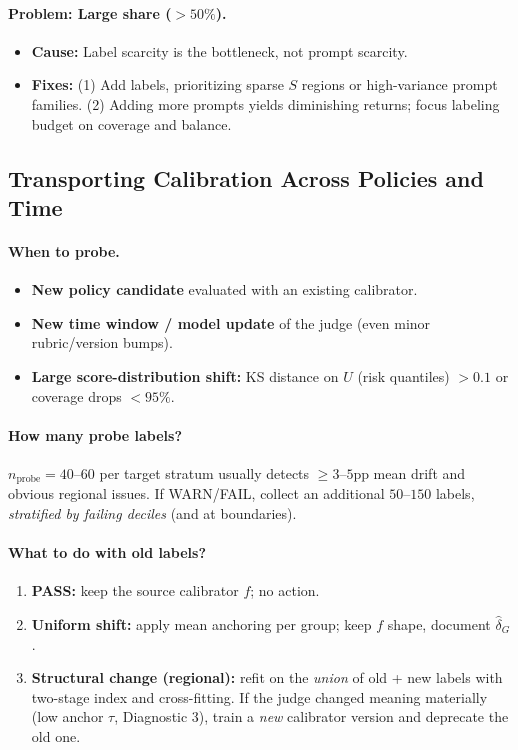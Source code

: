 \paragraph{Problem: Large \oua{} share ($> 50\%$).}
\begin{itemize}
\item \textbf{Cause:} Label scarcity is the bottleneck, not prompt scarcity.
\item \textbf{Fixes:} (1) Add labels, prioritizing sparse $S$ regions or high-variance prompt families. (2) Adding more prompts yields diminishing returns; focus labeling budget on coverage and balance.
\end{itemize}

\subsection{Transporting Calibration Across Policies and Time}
\label{sec:calib-refresh}

\paragraph{When to probe.}
\begin{itemize}
\item \textbf{New policy candidate} evaluated with an existing calibrator.
\item \textbf{New time window / model update} of the judge (even minor rubric/version bumps).
\item \textbf{Large score-distribution shift:} KS distance on $U$ (risk quantiles) $> 0.1$ or coverage drops $<95\%$.
\end{itemize}

\paragraph{How many probe labels?}
$n_{\text{probe}}=40\text{--}60$ per target stratum usually detects $\ge\!3$--$5$pp mean drift and obvious regional issues.
If WARN/FAIL, collect an additional $50\text{--}150$ labels, \emph{stratified by failing deciles} (and at boundaries).

\paragraph{What to do with old labels?}
\begin{enumerate}
\item \textbf{PASS:} keep the source calibrator $f$; no action.
\item \textbf{Uniform shift:} apply mean anchoring per group; keep $f$ shape, document $\hat\delta_G$.
\item \textbf{Structural change (regional):} refit \autocal{} on the \emph{union} of old + new labels with two-stage index and cross-fitting. If the judge changed meaning materially (low anchor $\tau$, Diagnostic 3), train a \emph{new} calibrator version and deprecate the old one.
\end{enumerate}

